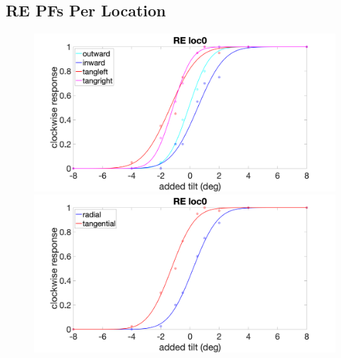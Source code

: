 \documentclass[11pt]{article} %
\begin{document}
\subsection{RE PFs Per Location}
\begin{figure}[H]
\centering %
\includegraphics[scale=.15]{Images/RE_PF_loc0_4conds.png}
\includegraphics[scale=.15]{Images/RE_PF_loc0_2conds.png}
\end{figure}
\end{document}
